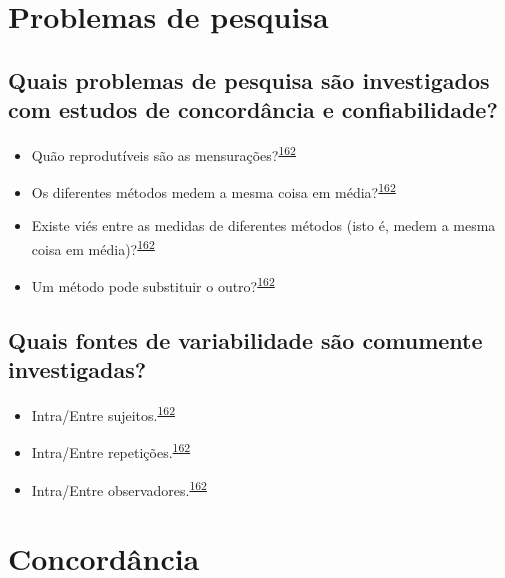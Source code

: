 \documentclass[
  a4paper,
]{book}
\begin{document}
\hypertarget{problemas}{%
\section{Problemas de pesquisa}\label{problemas}}

\hypertarget{quais-problemas-de-pesquisa-suxe3o-investigados-com-estudos-de-concorduxe2ncia-e-confiabilidade}{%
\subsection{Quais problemas de pesquisa são investigados com estudos de concordância e confiabilidade?}\label{quais-problemas-de-pesquisa-suxe3o-investigados-com-estudos-de-concorduxe2ncia-e-confiabilidade}}

\begin{itemize}
\item
  Quão reprodutíveis são as mensurações?\textsuperscript{\protect\hyperlink{ref-altman1983}{162}}
\item
  Os diferentes métodos medem a mesma coisa em média?\textsuperscript{\protect\hyperlink{ref-altman1983}{162}}
\item
  Existe viés entre as medidas de diferentes métodos (isto é, medem a mesma coisa em média)?\textsuperscript{\protect\hyperlink{ref-altman1983}{162}}
\item
  Um método pode substituir o outro?\textsuperscript{\protect\hyperlink{ref-altman1983}{162}}
\end{itemize}

\hypertarget{quais-fontes-de-variabilidade-suxe3o-comumente-investigadas}{%
\subsection{Quais fontes de variabilidade são comumente investigadas?}\label{quais-fontes-de-variabilidade-suxe3o-comumente-investigadas}}

\begin{itemize}
\item
  Intra/Entre sujeitos.\textsuperscript{\protect\hyperlink{ref-altman1983}{162}}
\item
  Intra/Entre repetições.\textsuperscript{\protect\hyperlink{ref-altman1983}{162}}
\item
  Intra/Entre observadores.\textsuperscript{\protect\hyperlink{ref-altman1983}{162}}
\end{itemize}

\hypertarget{concordancia}{%
\section{Concordância}\label{concordancia}}
\end{document}
